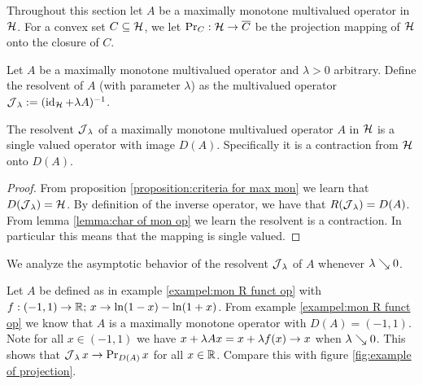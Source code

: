 Throughout this section let $ A $ be a maximally monotone multivalued
operator in $ \mathcal{H} $. For a convex set $ C\subseteq \mathcal{H} $, we
let $ \operatorname{\mathrm{Pr}}_C:\mathcal{H}\rightarrow \overline{C} $ be the projection mapping
of $ \mathcal{H} $ onto the closure of $ C $.\smallskip

\begin{definition}\label{def:resolvent}
	Let $ A $ be a maximally monotone multivalued operator and $ \lambda > 0 $ arbitrary. Define the resolvent of $ A $ (with parameter $ \lambda $) as
	the multivalued operator $ \operatorname{\mathcal{J}}_\lambda:=(\operatorname{\mathrm{id}}_{\mathcal{H}}+\lambda A)^{-1} $.
\end{definition}

\begin{lemma}\label{lemma:res is contr onto dom}
	The resolvent $ \operatorname{\mathcal{J}}_\lambda $ of a maximally monotone multivalued operator 
	$ A $ in $ \mathcal{H} $ is a single valued operator with image $ D(A) $. 
	Specifically it is a contraction from $ \mathcal{H} $ onto $ D(A) $.
\end{lemma}
\begin{proof}
	From proposition \ref{proposition:criteria for max mon} we learn
	that $ D(\operatorname{\mathcal{J}}_\lambda)=\mathcal{H} $. By definition of the inverse operator, 
	we have that $ R(\operatorname{\mathcal{J}}_\lambda)=D(A) $.
	From lemma \ref{lemma:char of mon op} we learn the resolvent is a contraction. 
	In particular this means that the mapping is single valued.
\end{proof}

We analyze the asymptotic behavior of the resolvent $ \operatorname{\mathcal{J}}_\lambda $
of $ A $ whenever $ \lambda\searrow 0 $. 

\begin{example}
	Let $ A $ be defined as in example \ref{exampel:mon R funct op} with 
	$ f:(-1,1)\rightarrow \mathbb{R};\, x \rightarrow \ln(1-x)-\ln(1+x) $. From
	example \ref{exampel:mon R funct op} we know that 
	$ A $ is a maximally monotone operator with $ D(A)=(-1,1) $. 
	Note for all $ x\in (-1,1) $ we have $ x+\lambda Ax
	= x +\lambda f(x) \rightarrow x $ when $ \lambda \searrow 0 $. This
	shows that $ \operatorname{\mathcal{J}}_\lambda x \rightarrow \operatorname{\mathrm{Pr}}_{D(A)} x $ 
	for all $ x\in\mathbb{R} $. Compare this with figure 
	\ref{fig:example of projection}.
\end{example}


